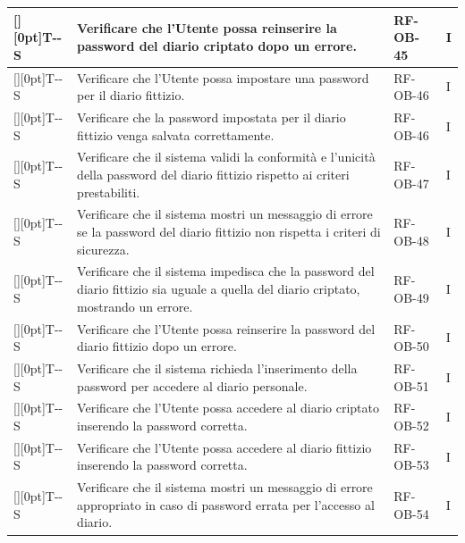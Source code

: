 \documentclass[a4paper,12pt]{article}
\newcounter{testsys}
\newcommand{\systestcode}{%
  \raisebox{0pt}[\height][0pt]{\hypertarget{T-\arabic{testsys}-S}{}}T-\arabic{testsys}-S%
}
\begin{document}
\begin{longtable}{| >{\centering\arraybackslash}p{} | >{\raggedright\arraybackslash}p{} | >{\centering\arraybackslash}p{} | >{\centering\arraybackslash}p{} |}
\stepcounter{testsys} \systestcode & Verificare che l'Utente possa reinserire la password del diario criptato dopo un errore. & RF-OB-45 & I \\
\hline

\stepcounter{testsys} \systestcode & Verificare che l'Utente possa impostare una password per il diario fittizio. & RF-OB-46 & I \\
\hline

\stepcounter{testsys} \systestcode & Verificare che la password impostata per il diario fittizio venga salvata correttamente. & RF-OB-46 & I \\
\hline

\stepcounter{testsys} \systestcode & Verificare che il sistema validi la conformità e l'unicità della password del diario fittizio rispetto ai criteri prestabiliti. & RF-OB-47 & I \\
\hline

\stepcounter{testsys} \systestcode & Verificare che il sistema mostri un messaggio di errore se la password del diario fittizio non rispetta i criteri di sicurezza. & RF-OB-48 & I \\
\hline

\stepcounter{testsys} \systestcode & Verificare che il sistema impedisca che la password del diario fittizio sia uguale a quella del diario criptato, mostrando un errore. & RF-OB-49 & I \\
\hline

\stepcounter{testsys} \systestcode & Verificare che l'Utente possa reinserire la password del diario fittizio dopo un errore. & RF-OB-50 & I \\
\hline

\stepcounter{testsys} \systestcode & Verificare che il sistema richieda l'inserimento della password per accedere al diario personale. & RF-OB-51 & I \\
\hline

\stepcounter{testsys} \systestcode & Verificare che l'Utente possa accedere al diario criptato inserendo la password corretta. & RF-OB-52 & I \\
\hline

\stepcounter{testsys} \systestcode & Verificare che l'Utente possa accedere al diario fittizio inserendo la password corretta. & RF-OB-53 & I \\
\hline

\stepcounter{testsys} \systestcode & Verificare che il sistema mostri un messaggio di errore appropriato in caso di password errata per l'accesso al diario. & RF-OB-54 & I \\
\hline


\end{longtable}
\end{document}

